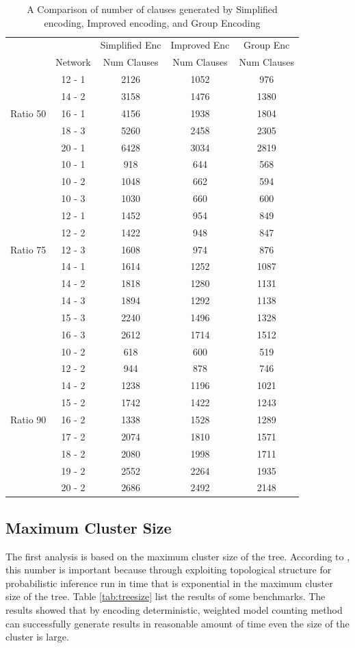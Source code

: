 \begin{table}[]
    \centering
    \begin{tabular}{c c c c c}
    \hline
    &	    			&	Simplified Enc	&	Improved Enc	&	Group Enc	\\
    &	Network			&	Num Clauses	&	Num Clauses	&	Num Clauses	\\
    \hline
    \hline
	&	12	-	1	&	2126	&	1052	&	976	\\
	&	14	-	2	&	3158	&	1476	&	1380	\\
Ratio 50	&	16	-	1	&	4156	&	1938	&	1804	\\
	&	18	-	3	&	5260	&	2458	&	2305	\\
	&	20	-	1	&	6428	&	3034	&	2819	\\
	\hline
	&	10	-	1	&	918	&	644	&	568	\\
	&	10	-	2	&	1048	&	662	&	594	\\
	&	10	-	3	&	1030	&	660	&	600	\\
	&	12	-	1	&	1452	&	954	&	849	\\
	&	12	-	2	&	1422	&	948	&	847	\\
Ratio 75	&	12	-	3	&	1608	&	974	&	876	\\
	&	14	-	1	&	1614	&	1252	&	1087	\\
	&	14	-	2	&	1818	&	1280	&	1131	\\
	&	14	-	3	&	1894	&	1292	&	1138	\\
	&	15	-	3	&	2240	&	1496	&	1328	\\
	&	16	-	3	&	2612	&	1714	&	1512	\\
	\hline
	&	10	-	2	&	618	&	600	&	519	\\
	&	12	-	2	&	944	&	878	&	746	\\
	&	14	-	2	&	1238	&	1196	&	1021	\\
	&	15	-	2	&	1742	&	1422	&	1243	\\
Ratio 90	&	16	-	2	&	1338	&	1528	&	1289	\\
	&	17	-	2	&	2074	&	1810	&	1571	\\
	&	18	-	2	&	2080	&	1998	&	1711	\\
	&	19	-	2	&	2552	&	2264	&	1935	\\
	&	20	-	2	&	2686	&	2492	&	2148	\\
	\hline
	\hline
    \end{tabular}
    \caption{A Comparison of number of clauses generated by Simplified encoding, Improved encoding, and Group Encoding}
    \label{tab:comparing the clauses}
\end{table}

\subsection{Maximum Cluster Size}
The first analysis is based on the maximum cluster size of the tree. According to \cite{2008-literature-review}, this number is important because through exploiting topological structure for probabilistic inference run in time that is exponential in the maximum cluster size of the tree. Table \ref{tab:treesize} list the results of some benchmarks. The results showed that by encoding deterministic, weighted model counting method can successfully generate results in reasonable amount of time even the size of the cluster is large. \\

